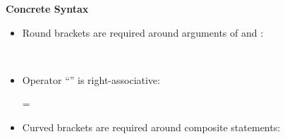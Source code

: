 \documentclass{article}
\begin{document}

\vskip 5mm
\textbf{Concrete Syntax}

\justify

\begin{itemize}
\item Round brackets are required around arguments of  and :

 \\

\item Operator ``\llang{;}'' is right-associative: 

 = 

\item Curved brackets are required around composite statements:


\end{itemize}
\end{document}
